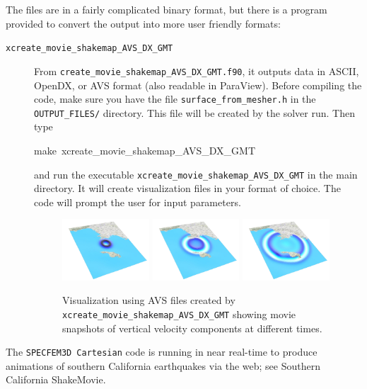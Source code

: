 The files are in a fairly complicated binary format, but there is
a program provided to convert the output into more user friendly formats:
\begin{description}
\item [{\texttt{xcreate\_movie\_shakemap\_AVS\_DX\_GMT}}] From \texttt{create\_movie\_shakemap\_AVS\_DX\_GMT.f90},
it outputs data in ASCII, OpenDX, or AVS format (also readable in
ParaView). Before compiling the code, make sure you have the file
\texttt{surface\_from\_mesher.h} in the \texttt{OUTPUT\_FILES/} directory.
This file will be created by the solver run. Then type

\begin{lyxcode}
{\footnotesize make~xcreate\_movie\_shakemap\_AVS\_DX\_GMT}{\footnotesize \par}
\end{lyxcode}

and run the executable \texttt{xcreate\_movie\_shakemap\_AVS\_DX\_GMT}
in the main directory. It will create visualization files
in your format of choice. The code will prompt the user for input
parameters.


\begin{figure}[htbp]
\noindent \begin{centering}
\includegraphics[width=0.32\textwidth]{figures/movie_surf_1.jpg}
\includegraphics[width=0.32\textwidth]{figures/movie_surf_2.jpg}
\includegraphics[width=0.32\textwidth]{figures/movie_surf_3.jpg}
\par\end{centering}

\caption{Visualization using AVS files created by \texttt{xcreate\_movie\_shakemap\_AVS\_DX\_GMT}
showing movie snapshots of vertical velocity components at different
times.}


\label{fig:movie.surf}
\end{figure}


\end{description}
The \texttt{SPECFEM3D Cartesian} code is running in near real-time
to produce animations of southern California earthquakes via the web;
see Southern California ShakeMovie\textregistered{}.


